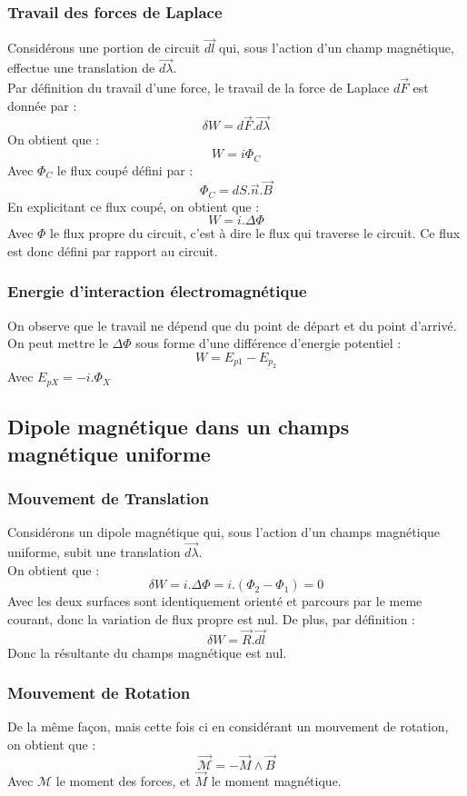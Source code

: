 \subsubsection{Travail des forces de Laplace}
Considérons une portion de circuit $\overrightarrow{dl}$ qui, sous l'action d'un champ magnétique, effectue une translation de $\overrightarrow{d\lambda}$.\\
Par définition du travail d'une force, le travail de la force de Laplace $d\overrightarrow{F}$ est donnée par : 
$$\delta W = d\overrightarrow{F}.\overrightarrow{d\lambda}$$
On obtient que :
$$W = i \Phi_C$$
Avec $\Phi_C$ le flux coupé défini par : 
$$\Phi_C = dS.\overrightarrow{n}.\overrightarrow{B}$$
En explicitant ce flux coupé, on obtient que :
$$W = i.\Delta \Phi$$
Avec $\Phi$ le flux propre du circuit, c'est à dire le flux qui traverse le circuit. Ce flux est donc défini par rapport au circuit.
\subsubsection{Energie d'interaction électromagnétique}
On observe que le travail ne dépend que du point de départ et du point d'arrivé.\\
On peut mettre le $\Delta \Phi$ sous forme d'une différence d'energie potentiel : 
$$W = E_{p1} - E_{p_2}$$
Avec $E_{pX} = -i.\Phi_X$
\subsection{Dipole magnétique dans un champs magnétique uniforme}
\subsubsection{Mouvement de Translation}
\begin{prop}
Considérons un dipole magnétique qui, sous l'action d'un champs magnétique uniforme, subit une translation $\overrightarrow{d\lambda}$.\\
On obtient que :
$$\delta W = i.\Delta \Phi = i.(\Phi_2-\Phi_1) = 0$$
Avec les deux surfaces sont identiquement orienté et parcours par le meme courant, donc la variation de flux propre est nul. De plus, par définition : 
$$\delta W = \overrightarrow{R}.\overrightarrow{dl}$$
Donc la résultante du champs magnétique est nul.
\end{prop}
\subsubsection{Mouvement de Rotation}
\begin{prop}
De la même façon, mais cette fois ci en considérant un mouvement de rotation, on obtient que : 
$$\overrightarrow{\mathcal{M}} = - \overrightarrow{M}\wedge \overrightarrow{B}$$
Avec $\mathcal{M}$ le moment des forces, et $\overrightarrow{M}$ le moment magnétique.
\end{prop}

